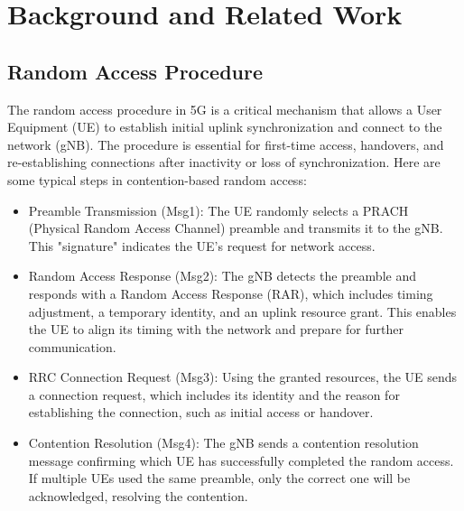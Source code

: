 \chapter{Background and Related Work}
\label{chap:background}


\section{Random Access Procedure}
The random access procedure in 5G is a critical mechanism that allows a User Equipment (UE) to establish initial uplink synchronization and connect to the network (gNB). The procedure is essential for first-time access, handovers, and re-establishing connections after inactivity or loss of synchronization. Here are some typical steps in contention-based random access: 
\begin{itemize}
    \item Preamble Transmission (Msg1): The UE randomly selects a PRACH (Physical Random Access Channel) preamble and transmits it to the gNB. This "signature" indicates the UE's request for network access.

    \item Random Access Response (Msg2): The gNB detects the preamble and responds with a Random Access Response (RAR), which includes timing adjustment, a temporary identity, and an uplink resource grant. This enables the UE to align its timing with the network and prepare for further communication.

    \item RRC Connection Request (Msg3): Using the granted resources, the UE sends a connection request, which includes its identity and the reason for establishing the connection, such as initial access or handover.

    \item Contention Resolution (Msg4): The gNB sends a contention resolution message confirming which UE has successfully completed the random access. If multiple UEs used the same preamble, only the correct one will be acknowledged, resolving the contention.
\end{itemize}

